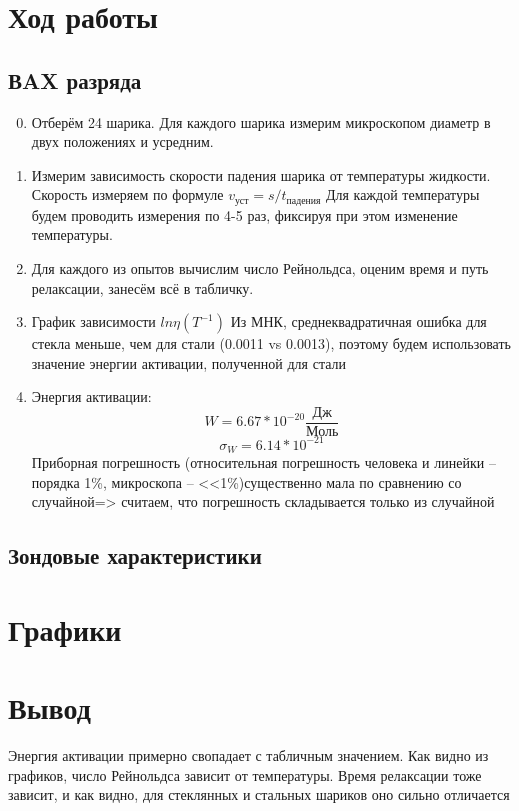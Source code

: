 \documentclass[11pt,a4paper]{article}
\begin{document}
\section*{Ход работы}
\subsection*{ВAX разряда}
\begin{enumerate}
  \setcounter{enumi}{-1}
  \item Отберём 24 шарика. Для каждого шарика измерим микроскопом
  диаметр в двух положениях и усредним.
  \item Измерим зависимость скорости падения шарика от температуры жидкости.
  Скорость измеряем по формуле $v_\text{уст} = s / t_\text{падения}$
  Для каждой температуры будем проводить измерения по 4-5 раз, фиксируя при этом изменение температуры.
  \item Для каждого из опытов вычислим число Рейнольдса, оценим время и путь релаксации,
  занесём всё в табличку.
  \item График зависимости $ln \eta  (T^{-1})$
  Из МНК, среднеквадратичная ошибка для стекла меньше, чем для стали (0.0011 vs 0.0013), поэтому будем использовать
  значение энергии активации, полученной для стали
  \item Энергия активации:
  \[W = 6.67 * 10 ^ {-20}\frac{\text{Дж}}{\text{Моль}}\]
  \[\sigma_W =  6.14 * 10 ^ {-21}\]
  Приборная погрешность (относительная погрешность человека и линейки -- порядка 1\%, микроскопа -- <<1\%)существенно мала по сравнению со случайной=>
  считаем, что погрешность складывается только из случайной
\end{enumerate}

\subsection*{Зондовые характеристики}


\section*{Графики}

\section*{Вывод}
Энергия активации примерно свопадает с табличным значением.
Как видно из графиков, число Рейнольдса зависит от температуры.
Время релаксации тоже зависит, и как видно, для стеклянных и стальных шариков оно сильно отличается
\end{document}
